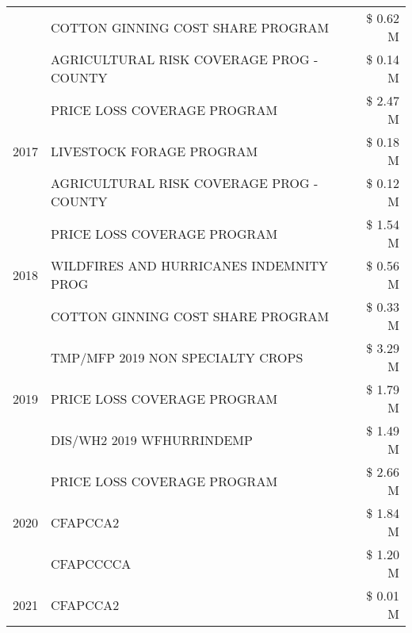 \begin{tabular}{llr}
 & COTTON GINNING COST SHARE PROGRAM             & \$ 0.62 M \\
 & AGRICULTURAL RISK COVERAGE PROG - COUNTY      & \$ 0.14 M \\
\cline{1-3}
\multirow[t]{3}{*}{2017} & PRICE LOSS COVERAGE PROGRAM & \$ 2.47 M \\
 & LIVESTOCK FORAGE PROGRAM & \$ 0.18 M \\
 & AGRICULTURAL RISK COVERAGE PROG - COUNTY & \$ 0.12 M \\
\cline{1-3}
\multirow[t]{3}{*}{2018} & PRICE LOSS COVERAGE PROGRAM & \$ 1.54 M \\
 & WILDFIRES AND HURRICANES INDEMNITY PROG & \$ 0.56 M \\
 & COTTON GINNING COST SHARE PROGRAM & \$ 0.33 M \\
\cline{1-3}
\multirow[t]{3}{*}{2019} & TMP/MFP 2019 NON SPECIALTY CROPS & \$ 3.29 M \\
 & PRICE LOSS COVERAGE PROGRAM & \$ 1.79 M \\
 & DIS/WH2 2019 WFHURRINDEMP & \$ 1.49 M \\
\cline{1-3}
\multirow[t]{3}{*}{2020} & PRICE LOSS COVERAGE PROGRAM & \$ 2.66 M \\
 & CFAPCCA2 & \$ 1.84 M \\
 & CFAPCCCCA & \$ 1.20 M \\
\cline{1-3}
2021 & CFAPCCA2 & \$ 0.01 M \\
\cline{1-3}
\bottomrule
\end{tabular}

